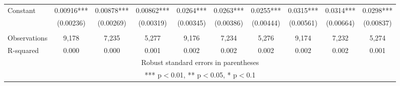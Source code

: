 \documentclass[]{article}
\begin{document}
\begin{tabular}{lccccccccc}
Constant & 0.00916*** & 0.00878*** & 0.00862*** & 0.0264*** & 0.0263*** & 0.0255*** & 0.0315*** & 0.0314*** & 0.0298*** \\
 & (0.00236) & (0.00269) & (0.00319) & (0.00345) & (0.00386) & (0.00444) & (0.00561) & (0.00664) & (0.00837) \\
 &  &  &  &  &  &  &  &  &  \\
Observations & 9,178 & 7,235 & 5,277 & 9,176 & 7,234 & 5,276 & 9,174 & 7,232 & 5,274 \\
 R-squared & 0.000 & 0.000 & 0.001 & 0.002 & 0.002 & 0.002 & 0.002 & 0.002 & 0.001 \\ \hline
\multicolumn{10}{c}{ Robust standard errors in parentheses} \\
\multicolumn{10}{c}{ *** p$<$0.01, ** p$<$0.05, * p$<$0.1} \\
\end{tabular}
\end{document}
